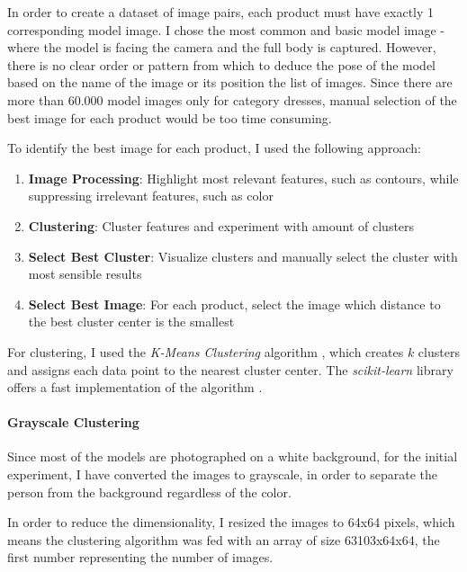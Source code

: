 \documentclass{article}
\begin{document}
In order to create a dataset of image pairs, each product must have exactly 1 corresponding model image. I chose the most common and basic model image - where the model is facing the camera and the full body is captured. However, there is no clear order or pattern from which to deduce the pose of the model based on the name of the image or its position the list of images. Since there are more than 60.000 model images only for category dresses, manual selection of the best image for each product would be too time consuming.

To identify the best image for each product, I used the following approach:
\begin{enumerate}
	\item \textbf{Image Processing}: Highlight most relevant features, such as contours, while suppressing irrelevant features, such as color
	\item \textbf{Clustering}: Cluster features and experiment with amount of clusters
	\item \textbf{Select Best Cluster}: Visualize clusters and manually select the cluster with most sensible results
	\item \textbf{Select Best Image}: For each product, select the image which distance to the best cluster center is the smallest
\end{enumerate}


For clustering, I used the \textit{K-Means Clustering} algorithm \cite{noauthor_k-means_2018}, which creates $k$ clusters and assigns each data point to the nearest cluster center. The \textit{scikit-learn} library offers a fast implementation of the algorithm \cite{noauthor_sklearn.cluster.kmeans_nodate}.

\paragraph{Grayscale Clustering}
Since most of the models are photographed on a white background, for the initial experiment, I have converted the images to grayscale, in order to separate the person from the background regardless of the color.

In order to reduce the dimensionality, I resized the images to 64x64 pixels, which means the clustering algorithm was fed with an array of size 63103x64x64, the first number representing the number of images. 
\end{document}
